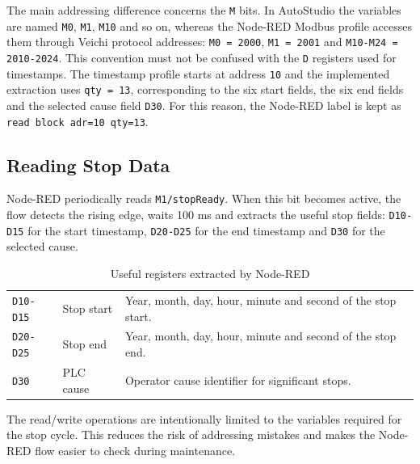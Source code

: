 The main addressing difference concerns the \texttt{M} bits. In AutoStudio the variables are named \texttt{M0}, \texttt{M1}, \texttt{M10} and so on, whereas the Node-RED Modbus profile accesses them through Veichi protocol addresses: \texttt{M0 = 2000}, \texttt{M1 = 2001} and \texttt{M10-M24 = 2010-2024}. This convention must not be confused with the \texttt{D} registers used for timestamps. The timestamp profile starts at address \texttt{10} and the implemented extraction uses \texttt{qty = 13}, corresponding to the six start fields, the six end fields and the selected cause field \texttt{D30}. For this reason, the Node-RED label is kept as \texttt{read block adr=10 qty=13}.

\subsection{Reading Stop Data}
Node-RED periodically reads \texttt{M1/stopReady}. When this bit becomes active, the flow detects the rising edge, waits 100 ms and extracts the useful stop fields: \texttt{D10-D15} for the start timestamp, \texttt{D20-D25} for the end timestamp and \texttt{D30} for the selected cause.

\begin{table}[H]
\centering
\caption{Useful registers extracted by Node-RED}
\begin{tabularx}{\textwidth}{|P{0.22\textwidth}|P{0.20\textwidth}|Y|}
\hline
{}
 &  &  \\
\hline
\texttt{D10-D15} & Stop start & Year, month, day, hour, minute and second of the stop start. \\
\hline
\texttt{D20-D25} & Stop end & Year, month, day, hour, minute and second of the stop end. \\
\hline
\texttt{D30} & PLC cause & Operator cause identifier for significant stops. \\
\hline
\end{tabularx}
\end{table}

The read/write operations are intentionally limited to the variables required for the stop cycle. This reduces the risk of addressing mistakes and makes the Node-RED flow easier to check during maintenance.

